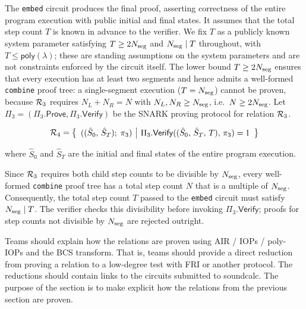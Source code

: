 The \texttt{embed} circuit produces the final proof, asserting correctness of the entire program execution
with public initial and final states. It assumes that
the total step count $T$ is known in advance to the verifier.
We fix $T$ as a publicly known system parameter satisfying $T \geq 2N_{\mathrm{seg}}$ and $N_{\mathrm{seg}} \mid T$
throughout, with $T \leq \mathsf{poly}(\lambda)$; these are standing assumptions on the system parameters and are not constraints
enforced by the circuit itself. The lower bound $T \geq 2N_{\mathrm{seg}}$ ensures that every execution
has at least two segments and hence admits a well-formed \texttt{combine} proof tree: a
single-segment execution ($T = N_{\mathrm{seg}}$) cannot be proven, because $\mathcal{R}_3$ requires
$N_L + N_R = N$ with $N_L, N_R \geq N_{\mathrm{seg}}$, i.e.\ $N \geq 2N_{\mathrm{seg}}$.
Let $\Pi_3=(\Pi_3.\mathsf{Prove}, \Pi_3.\mathsf{Verify})$ be the SNARK proving protocol for relation $\mathcal{R}_3$.

$$\mathcal{R}_4=\left\lbrace\begin{array}{c|c}
	((\hat{S}_0,\, \hat{S}_T);\; \pi_3) &
	\Pi_3.\mathsf{Verify}((\hat{S}_0,\, \hat{S}_T,\,T),\, \pi_3)=1
\end{array}\right\rbrace$$

where $\hat{S}_0$ and $\hat{S}_T$ are the initial and final states of the entire program execution.

\begin{remark}
Since $\mathcal{R}_3$ requires both child step counts to be divisible by $N_{\mathrm{seg}}$, every well-formed
\texttt{combine} proof tree has a total step count $N$ that is a multiple of $N_{\mathrm{seg}}$.
Consequently, the total step count $T$ passed to the \texttt{embed} circuit must satisfy
$N_{\mathrm{seg}} \mid T$.  The verifier checks this divisibility before invoking
$\Pi_3.\mathsf{Verify}$; proofs for step counts not divisible by $N_{\mathrm{seg}}$ are rejected outright.
\end{remark}

\begin{instruction}
  Teams should explain how the relations are proven using AIR / IOPs / poly-IOPs and the BCS transform. That is, teams should provide a direct reduction
from proving a relation to a low-degree test with
  FRI or another protocol. The reductions should contain links to the circuits submitted to soundcalc.
  The purpose of the section is to make explicit how the relations from the previous section are proven.
\end{instruction}

